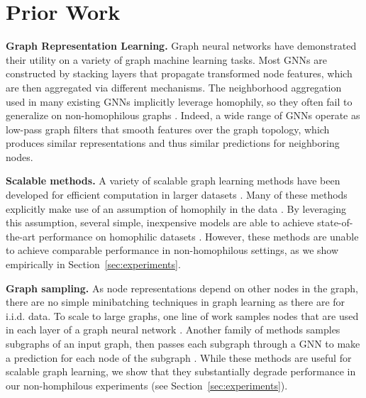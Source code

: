 \documentclass{article}
\newcommand{\myparagraph}[1]{\noindent \textbf{#1}}
\begin{document}
\section{Prior Work}

\myparagraph{Graph Representation Learning.} Graph neural networks \cite{hamilton2017inductive, kipf2017semi, velivckovic2018graph} have demonstrated their utility on a variety of graph machine learning tasks. Most GNNs are constructed by stacking layers that propagate transformed node features, which are then aggregated via different mechanisms. The neighborhood aggregation used in many existing GNNs implicitly leverage homophily, so they often fail to generalize on non-homophilous graphs \cite{zhu2020beyond, balcilar2021analyzing}. Indeed, a wide range of GNNs operate as low-pass graph filters \cite{nt2019revisiting, wu2019simplifying, balcilar2021analyzing} that smooth features over the graph topology, which produces similar representations and thus similar predictions for neighboring nodes. 


\myparagraph{Scalable methods.} A variety of scalable graph learning methods have been developed for efficient computation in larger datasets \cite{zeng2019graphsaint, chiang2019cluster, ying2018graph, hamilton2017inductive, wu2019simplifying, huang2021combining, deng2020graphzoom, bojchevski2020scaling}. Many of these methods explicitly make use of an assumption of homophily in the data \cite{wu2019simplifying, huang2021combining, deng2020graphzoom, bojchevski2020scaling}.  By leveraging this assumption, several simple, inexpensive models are able to achieve state-of-the-art performance on homophilic datasets \cite{wu2019simplifying, huang2021combining}. However, these methods are unable to achieve comparable performance in non-homophilous settings, as we show empirically in Section~\ref{sec:experiments}.

\myparagraph{Graph sampling.} As node representations depend on other nodes in the graph, there are no simple minibatching techniques in graph learning as there are for i.i.d. data. To scale to large graphs, one line of work samples nodes that are used in each layer of a graph neural network \cite{hamilton2017inductive, ying2018graph, chen2018fastgcn}. Another family of methods samples subgraphs of an input graph, then passes each subgraph through a GNN to make a prediction for each node of the subgraph \cite{chiang2019cluster, zeng2019accurate, zeng2019graphsaint}. While these methods are useful for scalable graph learning, we show that they substantially degrade performance in our non-homphilous experiments (see Section~\ref{sec:experiments}).
\end{document}
